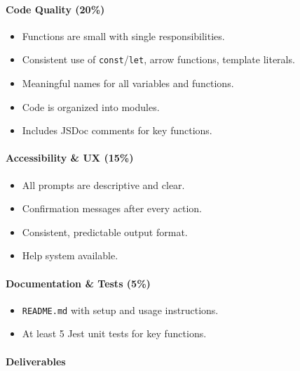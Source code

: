 \documentclass[
  justified,
  openright,
]{tufte-book}
\let\subsection\paragraph
\let\paragraph\paragraph
\let\subsection\paragraph
\let\paragraph\paragraph
\providecommand{\tightlist}{%
  \setlength{\itemsep}{0pt}\setlength{\parskip}{0pt}}
\begin{document}
\subsection{Code Quality (20\%)}\label{code-quality-20}

\begin{itemize}
\tightlist
\item[$\square$]
  Functions are small with single responsibilities.
\item[$\square$]
  Consistent use of \texttt{const}/\texttt{let}, arrow functions,
  template literals.
\item[$\square$]
  Meaningful names for all variables and functions.
\item[$\square$]
  Code is organized into modules.
\item[$\square$]
  Includes JSDoc comments for key functions.
\end{itemize}

\subsection{Accessibility \& UX (15\%)}\label{accessibility-ux-15}

\begin{itemize}
\tightlist
\item[$\square$]
  All prompts are descriptive and clear.
\item[$\square$]
  Confirmation messages after every action.
\item[$\square$]
  Consistent, predictable output format.
\item[$\square$]
  Help system available.
\end{itemize}

\subsection{Documentation \& Tests
(5\%)}\label{documentation-tests-5}

\begin{itemize}
\tightlist
\item[$\square$]
  \texttt{README.md} with setup and usage instructions.
\item[$\square$]
  At least 5 Jest unit tests for key functions.
\end{itemize}

\subsection{Deliverables}\label{deliverables-1}
\end{document}
